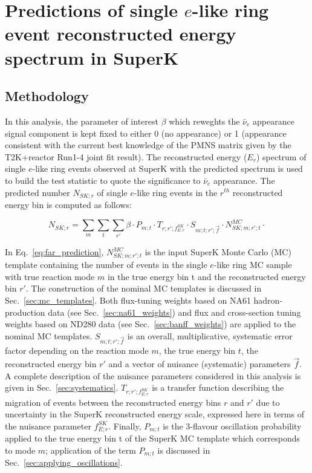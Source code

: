 \clearpage

\section {Predictions of single $e$-like ring event reconstructed energy spectrum in SuperK}
\label{sec:spectrum_prediction}

\subsection {Methodology}

In this analysis, 
the parameter of interest $\beta$ which reweghts the $\bar{\nu}_e$ appearance signal component
is kept fixed to either 0 (no appearance) or 1 (appearance consistent with the current best knowledge
of the PMNS matrix given by the T2K+reactor Run1-4 joint fit result).
The reconstructed energy ($E_{r}$) spectrum
of single $e$-like ring events observed at SuperK with the predicted spectrum
is used to build the test statistic to quote the significance to $\bar{\nu}_e$ appearance.
The predicted number $N_{SK;r}$ 
of single $e$-like ring events in the $r^{th}$ reconstructed energy bin
is computed as follows:

\begin{equation}
\displaystyle
  N_{SK;r} = 
    \sum_{m} \sum_{t} \sum_{r\prime}
    	\beta \cdot
        P_{m;t} \cdot
        T_{r;r\prime;f_{E; r}^{SK}} \cdot
        S_{m;t;r\prime;\vec{f}} \cdot
        N_{SK;m;r\prime;t}^{MC} \cdot
\label{eq:far_prediction}
\end{equation}

In Eq.~\ref{eq:far_prediction}, $N_{SK;m;r\prime;t}^{MC}$ is the input SuperK Monte Carlo (MC) template 
containing the number of events in the single $e$-like ring MC sample with true reaction mode $m$ in the 
true energy bin t and the reconstructed energy bin $r\prime$.
The construction of the nominal MC templates is discussed in Sec.~\ref{sec:mc_templates}.
Both flux-tuning weights based on NA61 hadron-production data (see Sec.~\ref{sec:na61_weights})
and flux and cross-section tuning weights based on ND280 data (see Sec.~\ref{sec:banff_weights})
are applied to the nominal MC templates.
$S_{m;t;r\prime;\vec{f}}$ is an overall, multiplicative, systematic error factor 
depending on the reaction mode $m$, the true energy bin $t$, the reconstructed energy bin $r\prime$ 
and a vector of nuisance (systematic) parameters $\vec{f}$. 
A complete description of the nuisance parameters considered in this analysis is given in Sec.~\ref{sec:systematics}.
$T_{r;r\prime;f_{E; r}^{SK}}$ is a transfer function describing the migration of events
between the reconstructed energy bins $r$ and $r\prime$ due to uncertainty in the SuperK reconstructed energy
scale, expressed here in terms of the nuisance parameter $f_{E; r}^{SK}$.
Finally, $P_{m;t}$ is the 3-flavour oscillation probability applied to the true energy
bin t of the SuperK MC template which corresponds to mode $m$;
application of the term $P_{m;t}$ is discussed in Sec.~\ref{sec:applying_oscillations}.

